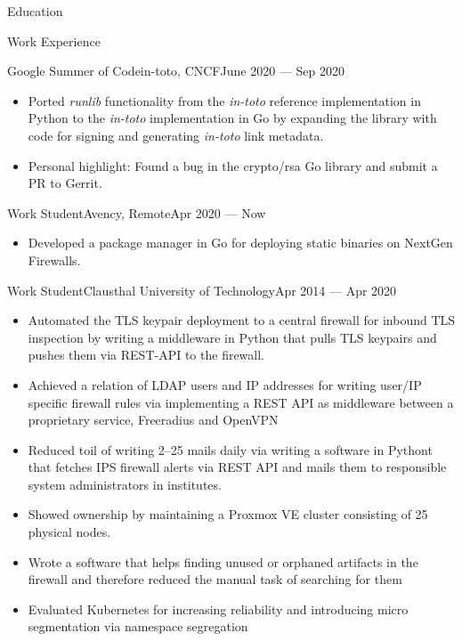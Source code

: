 \documentclass[]{mcdowellcv}
\begin{document}
\begin{cvsection}{Education}
\begin{cvsection}{Work Experience}
\begin{cvsubsection}{Google Summer of Code}{in-toto, CNCF}{June 2020 --- Sep 2020}
\begin{itemize}
\item Ported \textit{runlib} functionality from the \textit{in-toto} reference implementation in Python to the \textit{in-toto} implementation in Go by expanding the library with code for signing and generating \textit{in-toto} link metadata.
\item Personal highlight: Found a bug in the crypto/rsa Go library and submit a PR to Gerrit.
\end{itemize}
\end{cvsubsection}
\begin{cvsubsection}{Work Student}{Avency, Remote}{Apr 2020 --- Now}
\begin{itemize}
\item Developed a package manager in Go for deploying static binaries on NextGen Firewalls.
\end{itemize}
\end{cvsubsection}
\begin{cvsubsection}{Work Student}{Clausthal University of Technology}{Apr 2014 --- Apr 2020}
\bigskip
\begin{itemize}
\item Automated the TLS keypair deployment to a central firewall for inbound TLS inspection by writing a middleware in Python that pulls TLS keypairs and pushes them via REST-API to the firewall.
\item Achieved a relation of LDAP users and IP addresses for writing user/IP specific firewall rules via implementing
a REST API as middleware between a proprietary service, Freeradius and OpenVPN
\item Reduced toil of writing 2--25 mails daily via writing a software in Pythont that fetches IPS firewall alerts via REST API and mails them
to responsible system administrators in institutes.
\item Showed ownership by maintaining a Proxmox VE cluster consisting of 25 physical nodes.
\item Wrote a software that helps finding unused or orphaned artifacts in the firewall and therefore reduced the manual task of searching for them
\item Evaluated Kubernetes for increasing reliability and introducing micro segmentation via namespace segregation
\end{itemize}
\end{cvsubsection}
\end{cvsection}


\end{cvsection}
\end{document}
